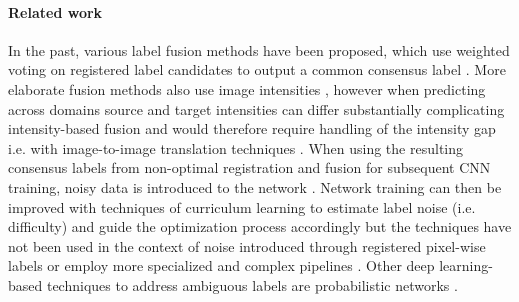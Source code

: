 
\paragraph{\textbf{Related work}}
\label{sec:related}
In the past, various label fusion methods have been proposed,
which use weighted voting on registered label candidates to output a common consensus label
\citep{artaechevarria2009combination,heckemann2006automatic,rohlfing2004performance,warfield2004simultaneous}.
More elaborate fusion methods also use image intensities \citep{wang2013multi}, however when predicting across domains source and target intensities can differ substantially complicating intensity-based fusion and would therefore require handling of the intensity gap i.e. with image-to-image translation techniques \citep{zhu2017unpaired}.
When using the resulting consensus labels from non-optimal registration and fusion for subsequent CNN training, noisy data is introduced to the network \citep{karimi2020deep}.
Network training can then be improved with techniques of curriculum learning to estimate label noise (i.e. difficulty) and guide the optimization process accordingly \citep{saxena2019data,castells2020superloss} but the techniques have not been used in the context of noise introduced through registered pixel-wise labels \citep{bengio2009curriculum,saxena2019data,castells2020superloss,jiang2018mentornet,zhang2020distilling} or employ more specialized and complex pipelines \citep{ding2019votenet,ding2020votenet+,liu2021style}.
Other deep learning-based techniques to address ambiguous labels are probabilistic networks \citep{kohl2018probabilistic}.

